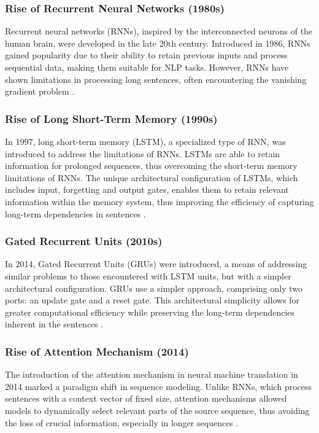 \subsubsection{Rise of Recurrent Neural Networks (1980s)}

Recurrent neural networks (RNNs), inspired by the interconnected neurons of the human brain, were developed in the late 20th century. Introduced in 1986, RNNs gained popularity due to their ability to retain previous inputs and process sequential data, making them suitable for NLP tasks. However, RNNs have shown limitations in processing long sentences, often encountering the vanishing gradient problem \cite{elman1990finding}.

\subsubsection{Rise of Long Short-Term Memory (1990s)}

In 1997, long short-term memory (LSTM), a specialized type of RNN, was introduced to address the limitations of RNNs. LSTMs are able to retain information for prolonged sequences, thus overcoming the short-term memory limitations of RNNs. The unique architectural configuration of LSTMs, which includes input, forgetting and output gates, enables them to retain relevant information within the memory system, thus improving the efficiency of capturing long-term dependencies in sentences \cite{hochreiter1997long}.

\subsubsection{Gated Recurrent Units (2010s)}

In 2014, Gated Recurrent Units (GRUs) were introduced, a means of addressing similar problems to those encountered with LSTM units, but with a simpler architectural configuration. GRUs use a simpler approach, comprising only two ports: an update gate and a reset gate. This architectural simplicity allows for greater computational efficiency while preserving the long-term dependencies inherent in the sentences \cite{cho2014learning}.

\subsubsection{Rise of Attention Mechanism (2014)}

The introduction of the attention mechanism in neural machine translation in 2014 marked a paradigm shift in sequence modeling. Unlike RNNs, which process sentences with a context vector of fixed size, attention mechanisms allowed models to dynamically select relevant parts of the source sequence, thus avoiding the loss of crucial information, especially in longer sequences \cite{bahdanau2014neural}.

